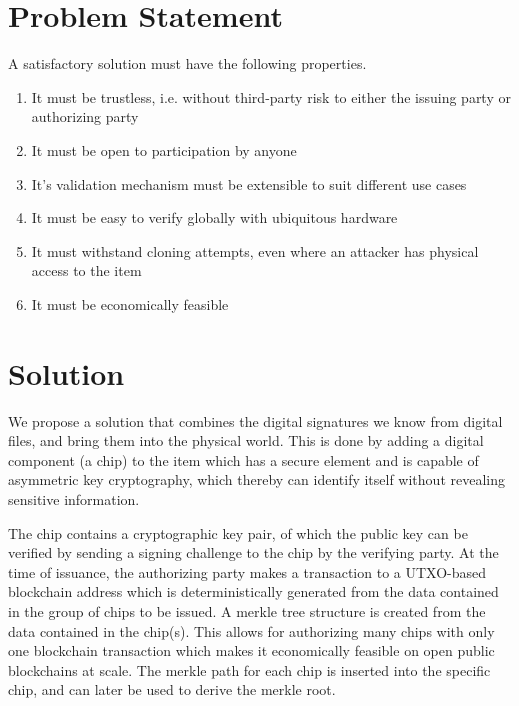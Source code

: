 \documentclass[twocolumn,titlepage]{article}
\begin{document}
\section{Problem Statement}
A satisfactory solution must have the following properties.
\begin{enumerate}
  \item It must be trustless, i.e. without third-party risk to either the issuing party or authorizing party
  \item It must be open to participation by anyone
  \item It's validation mechanism must be extensible to suit different use cases
  \item It must be easy to verify globally with ubiquitous hardware
  \item It must withstand cloning attempts, even where an attacker has physical access to the item
  \item It must be economically feasible
\end{enumerate}

\section{Solution}
We propose a solution that combines the digital signatures we know from digital files, and bring them into the physical world. This is done by adding a digital component (a chip) to the item which has a secure element and is capable of asymmetric key cryptography, which thereby can identify itself without revealing sensitive information.

The chip contains a cryptographic key pair, of which the public key can be verified by sending a signing challenge to the chip by the verifying party. At the time of issuance, the authorizing party makes a transaction to a UTXO-based blockchain address which is deterministically generated from the data contained in the group of chips to be issued. A merkle tree structure is created from the data contained in the chip(s). This allows for authorizing many chips with only one blockchain transaction which makes it economically feasible on open public blockchains at scale. The merkle path for each chip is inserted into the specific chip, and can later be used to derive the merkle root.
\end{document}
